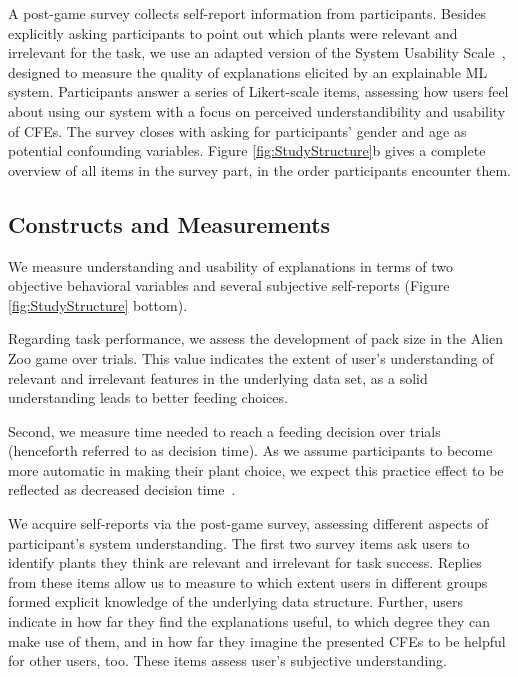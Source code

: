 A post-game survey collects self-report information from participants.
Besides explicitly asking participants to point out which plants were relevant and irrelevant for the task, we use an adapted version of the System Usability Scale~\citep{holzinger_measuring_2020}, designed to measure the quality of explanations elicited by an explainable \gls{ML} system.
Participants answer a series of Likert-scale items, assessing how users feel about using our system with a focus on perceived understandibility and usability of \glspl{CFE}.
The survey closes with asking for participants' gender and age as potential confounding variables.
Figure \ref{fig:StudyStructure}b gives a complete overview of all items in the survey part, in the order participants encounter them.

\subsection{Constructs and Measurements}

We measure understanding and usability of explanations in terms of two objective behavioral variables and several subjective self-reports (Figure \ref{fig:StudyStructure} bottom). 

Regarding task performance, we assess the development of pack size in the Alien Zoo game over trials. 
This value indicates the extent of user's understanding of relevant and irrelevant features in the underlying data set, as a solid understanding leads to better feeding choices. 

Second, we measure time needed to reach a feeding decision over trials (henceforth referred to as decision time). As we assume participants to become more automatic in making their plant choice, we expect this practice effect to be reflected as decreased decision time~\citep{logan_shapes_1992}. 

We acquire self-reports via the post-game survey, assessing different aspects of participant's system understanding. 
The first two survey items ask users to identify plants they think are relevant and irrelevant for task success. 
Replies from these items allow us to measure to which extent users in different groups formed explicit knowledge of the underlying data structure. Further, users indicate in how far they find the explanations useful, to which degree they can make use of them, and in how far they imagine the presented \glspl{CFE} to be helpful for other users, too. These items assess user's subjective understanding.

